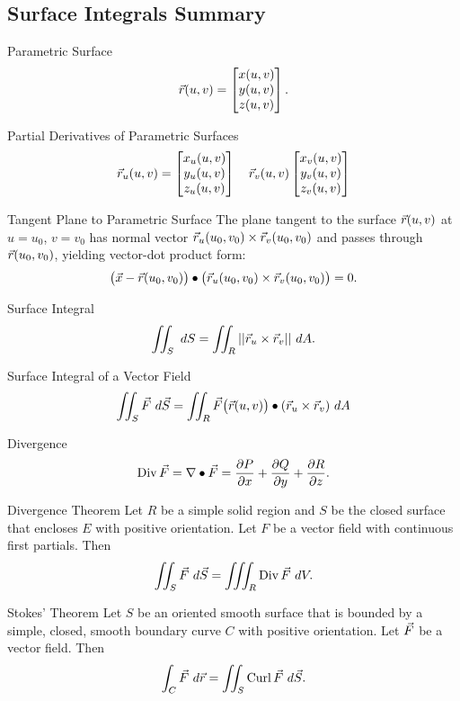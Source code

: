\renewcommand\thesubsection{\thesection.\Alph{subsection}}
\setcounter{subsection}{18}
\subsection{Surface Integrals Summary}
\begin{definition}{Parametric Surface} $$\vec{r}(u,v)=\begin{bmatrix}x(u,v)\\y(u,v)\\z(u,v)\end{bmatrix}.$$ 
\end{definition}

\begin{definition}{Partial Derivatives of Parametric Surfaces}
$$\vec{r}_u(u,v)=\begin{bmatrix}x_u(u,v)\\y_u(u,v)\\z_u(u,v)\end{bmatrix}\quad\vec{r}_v(u,v) \begin{bmatrix}x_v(u,v)\\y_v(u,v)\\z_v(u,v)\end{bmatrix} $$
\end{definition}

\begin{definition}{Tangent Plane to Parametric Surface}
The plane tangent to the surface $\vec{r}(u,v)$ at $u=u_0$, $v=v_0$ has normal vector $\vec{r}_u(u_0,v_0)\times\vec{r}_v(u_0,v_0)$ and passes through $\vec{r}(u_0,v_0)$, yielding vector-dot product form: $$\big(\vec{x}-\vec{r}(u_0,v_0)\big)\bullet\big(\vec{r}_u(u_0,v_0)\times\vec{r}_v(u_0,v_0)\big)=0. $$
\end{definition}

\begin{definition}{Surface Integral}
$$\iint_S \ dS= \iint_R ||\vcr_u\times\vcr_v||\ dA.$$
\end{definition}

\begin{definition}{Surface Integral of a Vector Field}
$$\iint_S \vec{F} \ d\vec{S} =\iint_R \vec{F}\big(\vec{r}(u,v)\big)\bullet(\vec{r}_u\times\vec{r}_v)\ dA$$
\end{definition}

\begin{definition}{Divergence}
$$\operatorname{Div}\vec{F}=\nabla\bullet\vec{F}=\frac{\partial P}{\partial x}+ \frac{\partial Q}{\partial y}+ \frac{\partial R}{\partial z} .$$
\end{definition}

\begin{theorem}{Divergence Theorem}
Let $R$ be a simple solid region and $S$ be the closed surface that encloses $E$ with positive orientation. Let $F$ be a vector field with continuous first partials. Then $$\iint_S \vcF \ d\vcS=\iiint_R \divo\vcF \ dV.$$
\end{theorem}

\begin{theorem}{Stokes' Theorem}
Let $S$ be an oriented smooth surface that is bounded by a simple, closed, smooth boundary curve $C$ with positive orientation. Let $\vec{F}$ be a vector field. Then $$\int_C\vcF \ d\vcr=\iint_S\curl\vcF\ d\vcS.$$
\end{theorem}
\renewcommand\thesubsection{\thesection.\arabic{subsection}}